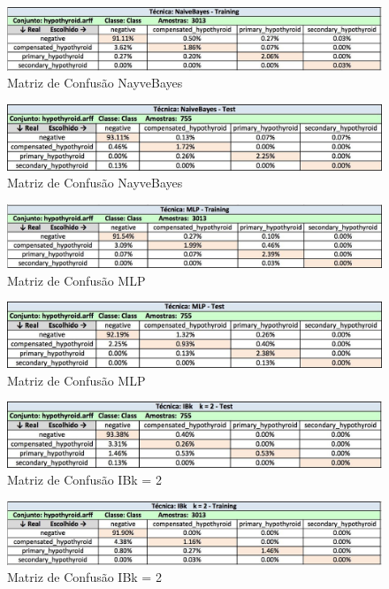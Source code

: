 \documentclass[12pt]{article}
\begin{document}
\begin{figure}[!h]
\centering
\includegraphics[width=.88\textwidth]{nb-train.png}
\caption{Matriz de Confusão NayveBayes}
\label{fig:trainnb}
\end{figure}

\begin{figure}[!h]
\centering
\includegraphics[width=.88\textwidth]{nb-test.png}
\caption{Matriz de Confusão NayveBayes}
\label{fig:testnb}
\end{figure}

\begin{figure}[!h]
\centering
\includegraphics[width=.88\textwidth]{mpl-train.png}
\caption{Matriz de Confusão MLP}
\label{fig:trainmlp}
\end{figure}
\begin{figure}[!h]
\centering
\includegraphics[width=.88\textwidth]{mpl-test.png}
\caption{Matriz de Confusão MLP}
\label{fig:testmlp}
\end{figure}

\begin{figure}[!h]
\centering
\includegraphics[width=.88\textwidth]{ibk2-train.png}
\caption{Matriz de Confusão IBk = 2}
\label{fig:trainibk2}
\end{figure}

\begin{figure}[!h]
\centering
\includegraphics[width=.88\textwidth]{ibk2-test.png}
\caption{Matriz de Confusão IBk = 2}
\label{fig:testibk2}
\end{figure}
\end{document}
